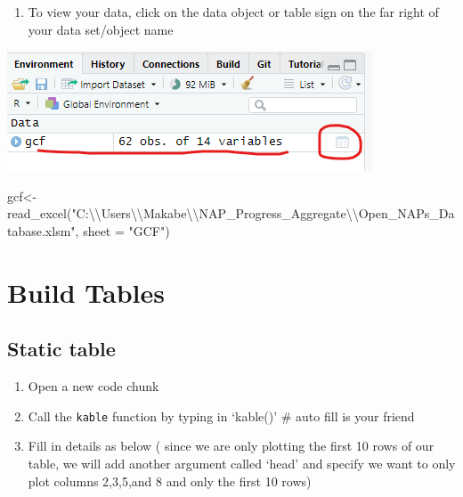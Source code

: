 \documentclass[
]{book}
\newenvironment{Shaded}{\begin{snugshade}}{\end{snugshade}}
\newcommand{\AttributeTok}[1]{\textcolor[rgb]{0.77,0.63,0.00}{#1}}
\newcommand{\FunctionTok}[1]{\textcolor[rgb]{0.00,0.00,0.00}{#1}}
\newcommand{\NormalTok}[1]{#1}
\newcommand{\OtherTok}[1]{\textcolor[rgb]{0.56,0.35,0.01}{#1}}
\newcommand{\SpecialCharTok}[1]{\textcolor[rgb]{0.00,0.00,0.00}{#1}}
\newcommand{\StringTok}[1]{\textcolor[rgb]{0.31,0.60,0.02}{#1}}
\providecommand{\tightlist}{%
  \setlength{\itemsep}{0pt}\setlength{\parskip}{0pt}}
\let\origfigure\figure
\let\endorigfigure\endfigure
\renewenvironment{figure}[1][2] {
    \expandafter\origfigure\expandafter[H]
} {
    \endorigfigure
}
\begin{document}
\begin{enumerate}
\def\labelenumi{\arabic{enumi}.}
\setcounter{enumi}{8}
\tightlist
\item
  To view your data, click on the data object or table sign on the far right of your data set/object name
\end{enumerate}

\begin{figure}
\centering
\includegraphics{tutorial_screenshots/view_exel.png}
\caption{view excel data}
\end{figure}

\begin{Shaded}
\begin{Highlighting}[]
\NormalTok{gcf}\OtherTok{\textless{}{-}}\FunctionTok{read\_excel}\NormalTok{(}\StringTok{"C:}\SpecialCharTok{\textbackslash{}\textbackslash{}}\StringTok{Users}\SpecialCharTok{\textbackslash{}\textbackslash{}}\StringTok{Makabe}\SpecialCharTok{\textbackslash{}\textbackslash{}}\StringTok{NAP\_Progress\_Aggregate}\SpecialCharTok{\textbackslash{}\textbackslash{}}\StringTok{Open\_NAPs\_Database.xlsm"}\NormalTok{, }\AttributeTok{sheet =} \StringTok{"GCF"}\NormalTok{)}
\end{Highlighting}
\end{Shaded}

\hypertarget{build-tables}{%
\section{Build Tables}\label{build-tables}}

\hypertarget{static-table}{%
\subsection{Static table}\label{static-table}}

\begin{enumerate}
\def\labelenumi{\arabic{enumi}.}
\tightlist
\item
  Open a new code chunk
\item
  Call the \texttt{kable} function by typing in `kable()' \# auto fill is your friend
\item
  Fill in details as below ( since we are only plotting the first 10 rows of our table, we will add another argument called `head' and specify we want to only plot columns 2,3,5,and 8 and only the first 10 rows)
\end{enumerate}
\end{document}
